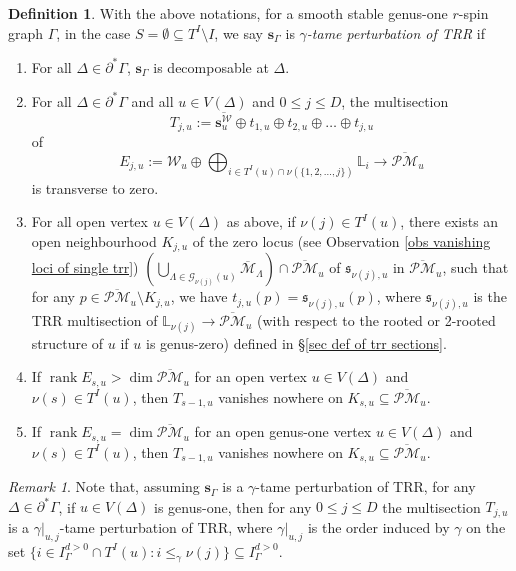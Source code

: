 \documentclass[11pt]{amsart}
\theoremstyle{definition}
\newtheorem{dfn}[dummy]{Definition}
\theoremstyle{remark}
\newtheorem{rmk}[dummy]{Remark}
\newcommand{\oPMb}{{\overline{\mathcal{PM}}}}
\newcommand{\<}{\left<}
\renewcommand{\>}{\right>}
\numberwithin{equation}{section}
\DeclareMathOperator{\rk}{rank}
\def\Mbar{{\overline{\mathcal M}}}
\begin{document}
    \begin{dfn}\label{def tame perturbation}
    With the above notations, for a smooth stable genus-one $r$-spin graph $\Gamma$, in the case $S=\emptyset\subseteq T^I\setminus I$, we say $\bm{s}_{\Gamma}$ is \textit{$\gamma$-tame perturbation of TRR} if 
    \begin{enumerate}
        \item For all $\Delta\in \partial^* \Gamma$, $\bm{s}_{\Gamma}$ is  decomposable at $\Delta$.
        \item For all $\Delta \in \partial^* \Gamma$ and all $u\in V(\Delta)$ and $0\le j \le D$, the multisection 
        $${T_{j,u}}:=\overline{\bm{s}^{\mathcal W}_u} \oplus t_{1,u}\oplus t_{2,u}\oplus\dots \oplus t_{j,u}$$ 
        of 
        $$E_{j,u}:=\mathcal W_{u}\oplus \bigoplus_{i\in T^I(u)\cap \nu(\{1,2,\dots,j\})} \mathbb L_i\to \oPMb_u$$ is transverse to zero.
    
    \item \label{item def tame K}
    For all open vertex $u\in V(\Delta)$ as above, if $\nu(j)\in T^I(u)$, there exists an open neighbourhood $K_{j,u}$  of the zero locus (see Observation \ref{obs vanishing loci of single trr}) $\left( \bigcup_{\Lambda\in \mathcal G_{\nu(j)}(u)}\Mbar_\Lambda\right)\cap \oPMb_u$ of $\mathfrak s_{\nu(j),u}$ in $\oPMb_u$, such that for any $p\in\oPMb_u\setminus K_{j,u}$, we have $t_{j,u}(p)=\mathfrak s_{\nu(j),u}(p)$, where $\mathfrak s_{\nu(j),u}$ is the TRR multisection of $\mathbb L_{\nu(j)}\to \oPMb_u$ (with respect to the rooted or 2-rooted structure of $u$ if $u$ is genus-zero) defined in \S \ref{sec def of trr sections}.

     \item \label{item def tame non vanish in K rk>dim}
    If $\rk  E_{s,u}> \dim \oPMb_u$ for an open vertex $u\in V(\Delta)$ and $\nu(s)\in T^I(u)$, then $T_{s-1,u}$ vanishes nowhere on $K_{s,u}\subseteq\oPMb_u$.

     \item \label{item def tame non vanish in K}
    If $\rk  E_{s,u}= \dim \oPMb_u$ for an open genus-one vertex $u\in V(\Delta)$ and $\nu(s)\in T^I(u)$, then $T_{s-1,u}$ vanishes nowhere on $K_{s,u}\subseteq\oPMb_u$.
   
    \end{enumerate}
\end{dfn}

\begin{rmk} \label{rmk on restriction of tame perturbation on g=1 vertex}
    Note that, assuming $\bm{s}_{\Gamma}$ is a $\gamma$-tame perturbation of TRR, for any $\Delta \in \partial^* \Gamma$, if $u\in V(\Delta)$ is genus-one, then for any $0\le j \le D$ the multisection $T_{j,u}$ is a $\gamma\vert_{u,j}$-tame perturbation of TRR, where $\gamma\vert_{u,j}$ is the order induced by $\gamma$ on the set $\{i\in I_{\Gamma}^{d>0} \cap T^I(u)\colon i\le_{\gamma} \nu(j)\}\subseteq I_{\Gamma}^{d>0}$.
\end{rmk}
\end{document}
